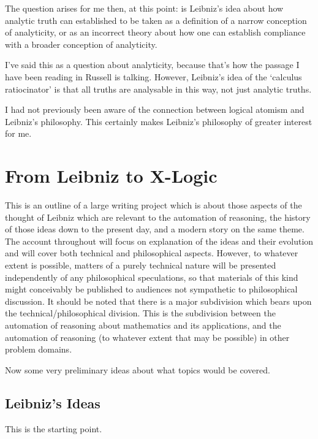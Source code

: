 \documentclass{rbjk}
\begin{document}
\begin{article}
The question arises for me then, at this point:
is Leibniz's idea about how analytic truth can established to be taken as a definition of a narrow conception of analyticity, or as an incorrect theory about how one can establish compliance with a broader conception of analyticity.

I've said this as a question about analyticity, because that's how the passage I have been reading in Russell is talking.
However, Leibniz's idea of the `calculus ratiocinator' is that all truths are analysable in this way, not just analytic truths.

I had not previously been aware of the connection between logical atomism and Leibniz's philosophy.
This certainly makes Leibniz's philosophy of greater interest for me.

\section{From Leibniz to X-Logic}

This is an outline of a large writing project which is about those aspects of the thought of Leibniz which are relevant to the automation of reasoning, the history of those ideas down to the present day, and a modern story on the same theme.
The account throughout will focus on explanation of the ideas and their evolution and will cover both technical and philosophical aspects.
However, to whatever extent is possible, matters of a purely technical nature will be presented independently of any philosophical speculations, so that materials of this kind might conceivably be published to audiences not sympathetic to philosophical discussion.
It should be noted that there is a major subdivision which bears upon the technical/philosophical division.
This is the subdivision between the automation of reasoning about mathematics and its applications, and the automation of reasoning (to whatever extent that may be possible) in other problem domains. 

Now some very preliminary ideas about what topics would be covered.

\subsection{Leibniz's Ideas}

This is the starting point.


\end{article}
\end{document}
